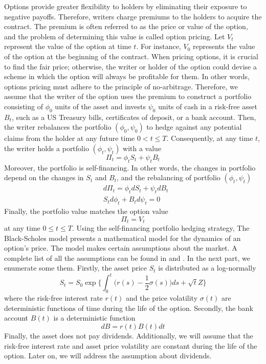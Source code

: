 Options provide greater flexibility to holders by eliminating their exposure to negative payoffs. Therefore, writers charge premiums to the holders to acquire the contract. The premium is often referred to as the price or value of the option, and the problem of determining this value is called option pricing. Let $V_t$ represent the value of the option at time $t$. For instance, $V_0$ represents the value of the option at the beginning of the contract. When pricing options, it is crucial to find the fair price; otherwise, the writer or holder of the option could devise a scheme in which the option will always be profitable for them. In other words, options pricing must adhere to the principle of no-arbitrage. Therefore, we assume that the writer of the option uses the premium to construct a portfolio consisting of $\phi_0$ units of the asset and invests $\psi_0$ units of cash in a risk-free asset $B_t$, such as a US Treasury bills, certificates of deposit, or a bank account. Then, the writer rebalances the portfolio $(\phi_0, \psi_0)$ to hedge against any potential claims from the holder at any future time $0 < t \le T$. Consequently, at any time $t$, the writer holds a portfolio $(\phi_t, \psi_t)$ with a value
\begin{equation*}
  \Pi_t = \phi_t S_t + \psi_t B_t
\end{equation*}
Moreover, the portfolio is self-financing. In other words, the changes in
portfolio depend on the changes in $S_t$ and $B_t$,
and the rebalancing of portfolio $(\phi_t, \psi_t)$
\begin{align*}
   & d\Pi_t = \phi_tdS_t + \psi_t dB_t \\
   & S_t d\phi_t + B_t d\psi_t = 0
\end{align*}
Finally, the portfolio value matches the option value
\begin{equation*}
  \Pi_t = V_t
\end{equation*}
at any time $0 \le t \le T$. Using the self-financing portfolio hedging strategy, The Black-Scholes model presents a mathematical model for the dynamics of an option's price. The model makes certain assumptions about the market. A complete list of all the assumptions can be found in \cite{merton_1973} and \cite{wilmott_howison_dewynne_1995}. In the next part, we enumerate some them. Firstly, the asset price $S_t$ is distributed as a log-normally
\begin{equation}
  S_t = S_0 \exp\bigg\{\int_{0}^{t} \big(r(s) - \dfrac{1}{2}\sigma(s)\big)ds + \sqrt{t}Z\bigg\}
  \label{eq:blackscholes:preliminaries:asset_price}
\end{equation}
where the risk-free interest rate $r(t)$ and the price volatility $\sigma(t)$ are deterministic functions of time during the life of the option. Secondly, the bank account $B(t)$ is a deterministic function
\begin{equation*}
  dB = r(t)B(t)dt
\end{equation*}
Finally, the asset does not pay dividends. Additionally, we will assume that
the risk-free interest rate and asset price volatility are constant during the
life of the option. Later on, we will address the assumption about dividends.

